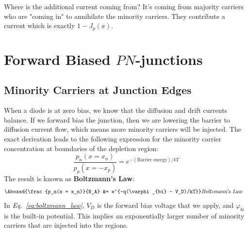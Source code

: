 Where is the additional current coming from?  It's coming from majority carriers who are "coming in" to annihilate the minority carriers.  They contribute a current which is exactly $1 - J_p(x)$.
\section{Forward Biased \texorpdfstring{$PN$}{PN}-junctions}
\subsection{Minority Carriers at Junction Edges}
When a diode is at zero bias, we know that the diffusion and drift currents balance.  If we forward bias the junction, then we are lowering the barrier to diffusion current flow, which means more minority carriers will be injected.  The exact derivation leads to the following expression for the minority carrier concentration at boundaries of the depletion region:
    \begin{equation} 
        \frac{p_n(x = x_n)}{p_p(x = -x_p)} = e^{-(\text{Barrier energy})/kT}
    \end{equation}
The result is known as \textbf{Boltzmann's Law}:
    \begin{align}
        \Aboxed{\frac{p_n(x = x_n)}{N_A} &= e^{-q(\varphi_{bi} - V_D)/kT}} &\textit{Boltzmann's Law} 
        \label{eq:boltzmann_law}
    \end{align}
In \emph{Eq.~\ref{eq:boltzmann_law}}, $V_D$ is the forward bias voltage that we apply, and $\varphi_{bi}$ is the built-in potential.  This implies an exponentially larger number of minority carriers that are injected into the regions.

